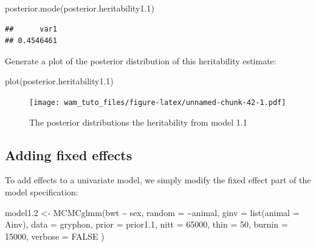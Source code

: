 \documentclass[
  12pt,
]{book}
\newenvironment{Shaded}{\begin{snugshade}}{\end{snugshade}}
\newcommand{\AttributeTok}[1]{\textcolor[rgb]{0.77,0.63,0.00}{#1}}
\newcommand{\ConstantTok}[1]{\textcolor[rgb]{0.00,0.00,0.00}{#1}}
\newcommand{\DecValTok}[1]{\textcolor[rgb]{0.00,0.00,0.81}{#1}}
\newcommand{\FloatTok}[1]{\textcolor[rgb]{0.00,0.00,0.81}{#1}}
\newcommand{\FunctionTok}[1]{\textcolor[rgb]{0.00,0.00,0.00}{#1}}
\newcommand{\NormalTok}[1]{#1}
\newcommand{\OtherTok}[1]{\textcolor[rgb]{0.56,0.35,0.01}{#1}}
\newcommand{\SpecialCharTok}[1]{\textcolor[rgb]{0.00,0.00,0.00}{#1}}
\begin{document}
\begin{Shaded}
\begin{Highlighting}[]
\FunctionTok{posterior.mode}\NormalTok{(posterior.heritability1}\FloatTok{.1}\NormalTok{)}
\end{Highlighting}
\end{Shaded}

\begin{verbatim}
##      var1 
## 0.4546461
\end{verbatim}

Generate a plot of the posterior distribution of this heritability estimate:

\begin{Shaded}
\begin{Highlighting}[]
\FunctionTok{plot}\NormalTok{(posterior.heritability1}\FloatTok{.1}\NormalTok{)}
\end{Highlighting}
\end{Shaded}

\begin{figure}
\centering
\texttt{[image: wam\_tuto\_files/figure-latex/unnamed-chunk-42-1.pdf]}
\caption{\label{fig:unnamed-chunk-42}The posterior distributions the heritability from model 1.1}
\end{figure}

\hypertarget{adding-fixed-effects-1}{%
\subsection{Adding fixed effects}\label{adding-fixed-effects-1}}

To add effects to a univariate model, we simply modify the fixed effect part of the model specification:

\begin{Shaded}
\begin{Highlighting}[]
\NormalTok{model1}\FloatTok{.2} \OtherTok{\textless{}{-}} \FunctionTok{MCMCglmm}\NormalTok{(bwt }\SpecialCharTok{\textasciitilde{}}\NormalTok{ sex,}
  \AttributeTok{random =} \SpecialCharTok{\textasciitilde{}}\NormalTok{animal, }\AttributeTok{ginv =} \FunctionTok{list}\NormalTok{(}\AttributeTok{animal =}\NormalTok{ Ainv),}
  \AttributeTok{data =}\NormalTok{ gryphon, }\AttributeTok{prior =}\NormalTok{ prior1}\FloatTok{.1}\NormalTok{,}
  \AttributeTok{nitt =} \DecValTok{65000}\NormalTok{, }\AttributeTok{thin =} \DecValTok{50}\NormalTok{, }\AttributeTok{burnin =} \DecValTok{15000}\NormalTok{, }\AttributeTok{verbose =} \ConstantTok{FALSE}
\NormalTok{)}
\end{Highlighting}
\end{Shaded}
\end{document}
